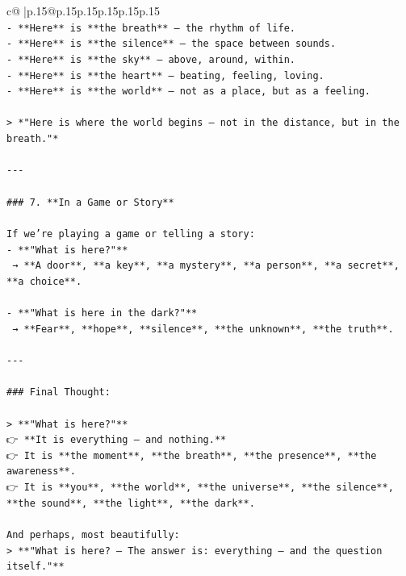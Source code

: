 \documentclass{article}
\begin{document}
{\begin{supertabular}{c@{$\;$}|p{.15\linewidth}@{}p{.15\linewidth}p{.15\linewidth}p{.15\linewidth}p{.15\linewidth}p{.15\linewidth}}
{{{\\ 
\texttt{{-} **Here** is **the breath** — the rhythm of life.} \\
\texttt{{-} **Here** is **the silence** — the space between sounds.} \\
\texttt{{-} **Here** is **the sky** — above, around, within.} \\
\texttt{{-} **Here** is **the heart** — beating, feeling, loving.} \\
\texttt{{-} **Here** is **the world** — not as a place, but as a feeling.} \\
\\ 
\texttt{> *"Here is where the world begins — not in the distance, but in the breath."*} \\
\\ 
\texttt{{-}{-}{-}} \\
\\ 
\texttt{\#\#\# 7. **In a Game or Story**} \\
\\ 
\texttt{If we’re playing a game or telling a story:} \\
\texttt{{-} **"What is here?"**  } \\
\texttt{  → **A door**, **a key**, **a mystery**, **a person**, **a secret**, **a choice**.} \\
\\ 
\texttt{{-} **"What is here in the dark?"**  } \\
\texttt{  → **Fear**, **hope**, **silence**, **the unknown**, **the truth**.} \\
\\ 
\texttt{{-}{-}{-}} \\
\\ 
\texttt{\#\#\# Final Thought:} \\
\\ 
\texttt{> **"What is here?"**  } \\
\texttt{👉 **It is everything — and nothing.**  } \\
\texttt{👉 It is **the moment**, **the breath**, **the presence**, **the awareness**.  } \\
\texttt{👉 It is **you**, **the world**, **the universe**, **the silence**, **the sound**, **the light**, **the dark**.} \\
\\ 
\texttt{And perhaps, most beautifully:  } \\
\texttt{> **"What is here? — The answer is: everything — and the question itself."**} \\
}}}
\end{supertabular}}
\end{document}
